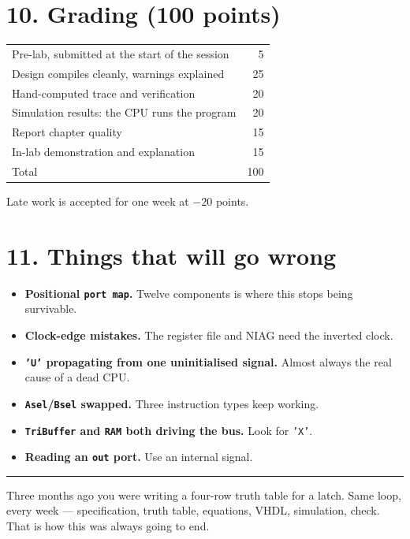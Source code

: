 \documentclass[11pt]{article}
\newcommand{\code}[1]{\texttt{#1}}
\newcommand{\hr}{\vspace{2pt}\hrule\vspace{6pt}}
\begin{document}
\section*{10. Grading (100 points)}

\begin{center}
\begin{tabular}{lr}
\toprule
Pre-lab, submitted at the start of the session & 5 \\
Design compiles cleanly, warnings explained & 25 \\
Hand-computed trace and verification & 20 \\
Simulation results: the CPU runs the program & 20 \\
Report chapter quality & 15 \\
In-lab demonstration and explanation & 15 \\
\midrule
Total & 100 \\
\bottomrule
\end{tabular}
\end{center}

Late work is accepted for one week at $-20$ points.

\section*{11. Things that will go wrong}

\begin{itemize}[leftmargin=1.6em,itemsep=1pt]
\item \textbf{Positional \code{port map}.} Twelve components is where this stops
being survivable.
\item \textbf{Clock-edge mistakes.} The register file and NIAG need the inverted
clock.
\item \textbf{\code{'U'} propagating from one uninitialised signal.} Almost
always the real cause of a dead CPU.
\item \textbf{\code{Asel}/\code{Bsel} swapped.} Three instruction types keep
working.
\item \textbf{\code{TriBuffer} and \code{RAM} both driving the bus.} Look for
\code{'X'}.
\item \textbf{Reading an \code{out} port.} Use an internal signal.
\end{itemize}

\vspace{10pt}
\hr
{\small Three months ago you were writing a four-row truth table for a latch.
Same loop, every week --- specification, truth table, equations, VHDL,
simulation, check. That is how this was always going to end.}
\end{document}

